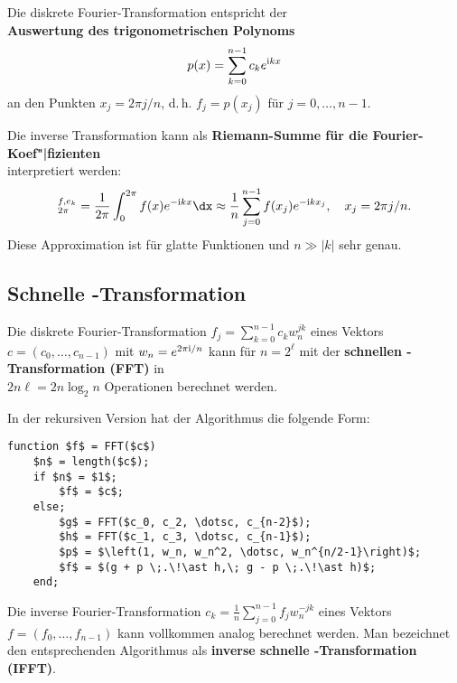 \linie

Die diskrete Fourier-Transformation entspricht der \\
\textbf{Auswertung des trigonometrischen Polynoms}
\begin{align*}
    p(x) = \sum_{k=0}^{n-1} c_k e^{\mathrm{i} k x}
\end{align*}
an den Punkten $x_j = 2 \pi j / n$, d.\,h. $f_j = p(x_j)$ für
$j = 0, \dotsc, n - 1$.

\linie

Die inverse Transformation kann als
\textbf{Riemann-Summe für die Fourier-Koef"|fizienten} \\
interpretiert werden:
\begin{align*}
    \sp{f, e_k}_{2\pi} = \frac{1}{2\pi} \int_0^{2\pi} f(x) e^{-\i k x} \dx
    \approx \frac{1}{n} \sum_{j=0}^{n-1} f(x_j) e^{-\i k x_j}, \quad
    x_j = 2 \pi j / n.
\end{align*}
Diese Approximation ist für glatte Funktionen und $n \gg |k|$ sehr genau.

\subsection{%
    Schnelle -Transformation%
}

Die diskrete Fourier-Transformation $f_j = \sum_{k=0}^{n-1} c_k w_n^{jk}$
eines Vektors $c = (c_0, \dotsc, c_{n-1})$ mit $w_n = e^{2\pi\mathrm{i}/n}$
kann für $n = 2^\ell$ mit der
\textbf{schnellen -Transformation (FFT)} in \\
$2n\ell = 2 n \log_2 n$ Operationen berechnet werden.

In der rekursiven Version hat der Algorithmus die folgende Form:
\begin{lstlisting}[mathescape]
function $f$ = FFT($c$)
    $n$ = length($c$);
    if $n$ = $1$;
        $f$ = $c$;
    else;
        $g$ = FFT($c_0, c_2, \dotsc, c_{n-2}$);
        $h$ = FFT($c_1, c_3, \dotsc, c_{n-1}$);
        $p$ = $\left(1, w_n, w_n^2, \dotsc, w_n^{n/2-1}\right)$;
        $f$ = $(g + p \;.\!\ast h,\; g - p \;.\!\ast h)$;
    end;
\end{lstlisting}

\linie
\pagebreak

Die inverse Fourier-Transformation
$c_k = \frac{1}{n} \sum_{j=0}^{n-1} f_j w_n^{-jk}$
eines Vektors $f = (f_0, \dotsc, f_{n-1})$
kann vollkommen analog berechnet werden.
Man bezeichnet den entsprechenden Algorithmus als
\textbf{inverse schnelle -Transformation (IFFT)}.

